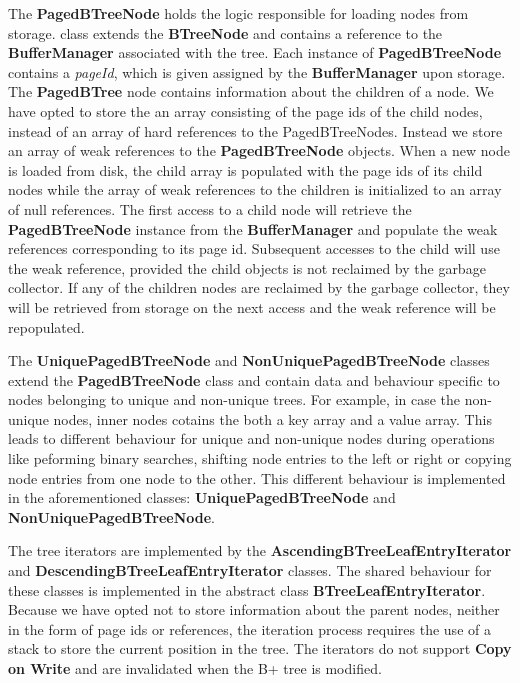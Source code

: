 \documentclass[11pt,a4paper,oneside]{article}
\begin{document}
The \textbf{PagedBTreeNode} holds the logic responsible for loading nodes from storage. class extends the \textbf{BTreeNode} and contains a reference to the \textbf{BufferManager} associated with the tree. Each instance of \textbf{PagedBTreeNode} contains a \textit{pageId}, which is given assigned by the \textbf{BufferManager} upon storage. The \textbf{PagedBTree} node contains information about the children of a node. We have opted to store the an array consisting of the page ids of the child nodes, instead of an array of hard references to the PagedBTreeNodes. Instead we store an array of weak references to the \textbf{PagedBTreeNode} objects. When a new node is loaded from disk, the child array is populated with the page ids of its child nodes while the array of weak references to the children is initialized to an array of null references. The first access to a child node will retrieve the \textbf{PagedBTreeNode} instance from the \textbf{BufferManager} and populate the weak references corresponding to its page id. Subsequent accesses to the child will use the weak reference, provided the child objects is not reclaimed by the garbage collector. If any of the children nodes are reclaimed by the garbage collector, they will be retrieved from storage on the next access and the weak reference will be repopulated.

The \textbf{UniquePagedBTreeNode} and \textbf{NonUniquePagedBTreeNode} classes extend the \textbf{PagedBTreeNode} class and contain data and behaviour specific to nodes belonging to unique and non-unique trees. For example, in case the non-unique nodes, inner nodes cotains the both a key array and a value array. This leads to different behaviour for unique and non-unique nodes during operations like peforming binary searches, shifting node entries to the left or right or copying node entries from one node to the other. This different behaviour is implemented in the aforementioned classes: \textbf{UniquePagedBTreeNode} and \textbf{NonUniquePagedBTreeNode}. 

The tree iterators are implemented by the \textbf{AscendingBTreeLeafEntryIterator} and \textbf{DescendingBTreeLeafEntryIterator} classes. The shared behaviour for these classes is implemented in the abstract class \textbf{BTreeLeafEntryIterator}. Because we have opted not to store information about the parent nodes, neither in the form of page ids or references, the iteration process requires the use of a stack to store the current position in the tree. The iterators do not support \textbf{Copy on Write} and are invalidated when the B+ tree is modified. 
\end{document}
